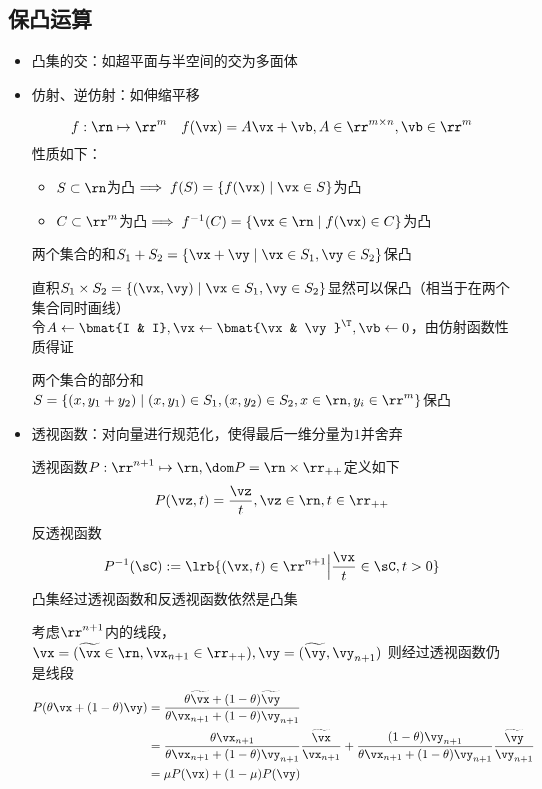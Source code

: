 \subsection{保凸运算}
\begin{itemize}
	\item 凸集的交：如超平面与半空间的交为多面体
	\item 仿射、逆仿射：如伸缩平移
\begin{definition}[仿射函数]
\[f:\rn\mapsto\rr^m\quad f(\vx)=A\vx+\vb,A\in\rr^{m\times n},\vb\in\rr^m\]
性质如下：
\begin{itemize}
	\item $S\subset\rn$为凸$\implies f(S)=\{f(\vx)\mid\vx\in S\}$为凸
	\item $C\subset\rr^m$为凸$\implies f^{-1}(C)=\{\vx\in\rn\mid f(\vx)\in C\}$为凸
\end{itemize}
\end{definition}
\begin{example}
两个集合的和$S_1+S_2=\{\vx+\vy\mid \vx\in S_1,\vy\in S_2\}$保凸
\end{example}
\begin{analysis}
直积$S_1\times S_2=\{(\vx,\vy)\mid \vx\in S_1,\vy\in S_2\}$显然可以保凸（相当于在两个集合同时画线）\\
令$A\gets\bmat{I & I},\vx\gets\bmat{\vx & \vy}^\T,\vb\gets 0$，由仿射函数性质得证
\end{analysis}
\begin{example}
	两个集合的部分和$S=\{(x,y_1+y_2)\mid(x,y_1)\in S_1,(x,y_2)\in S_2,x\in\rn,y_i\in\rr^m\}$保凸
\end{example}

	\item 透视函数：对向量进行规范化，使得最后一维分量为$1$并舍弃
\begin{definition}
透视函数$P:\rr^{n+1}\mapsto\rn,\dom P=\rn\times\rr_{++}$定义如下
\[P(\vz,t)=\dfrac{\vz}{t},\vz\in\rn,t\in\rr_{++}\]
反透视函数
\[P^{-1}(\sC):=\lrb{(\vx,t)\in\rr^{n+1}\Big|\frac{\vx}{t}\in \sC,t>0}\]
凸集经过透视函数和反透视函数依然是凸集
\end{definition}
\begin{analysis}
考虑$\rr^{n+1}$内的线段，$\vx=(\widetilde{\vx}\in\rn,\vx_{n+1}\in\rr_{++}),\vy=(\widetilde{\vy},\vy_{n+1})$
则经过透视函数仍是线段
\[\begin{aligned}
	P(\theta \vx+(1-\theta)\vy)&=\frac{\theta\widetilde{\vx}+(1-\theta)\widetilde{\vy}}{\theta \vx_{n+1}+(1-\theta) \vy_{n+1}}\\
	&=\frac{\theta \vx_{n+1}}{\theta \vx_{n+1}+(1-\theta)\vy_{n+1}}\frac{\widetilde{\vx}}{\vx_{n+1}}+\frac{(1-\theta)\vy_{n+1}}{\theta \vx_{n+1}+(1-\theta)\vy_{n+1}}\frac{\widetilde{\vy}}{\vy_{n+1}}\\
	&=\mu P(\vx)+(1-\mu)P(\vy)
\end{aligned}\]
\end{analysis}


\end{itemize}
